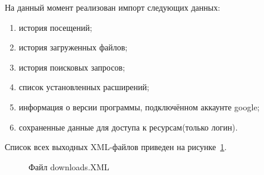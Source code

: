 На данный момент реализован импорт следующих данных:

\begin{enumerate}
  \item история посещений;
  \item история загруженных файлов;
  \item история поисковых запросов;
  \item список установленных расширений;
  \item информация о версии программы, подключённом аккаунте google;
  \item сохраненные данные для доступа к ресурсам(только логин).
\end{enumerate}

Список всех выходных XML-файлов приведен на рисунке~\ref{ship_12:ship_12}.

\begin{figure}[h!]
\caption{Файл downloads.XML}
\label{ship_12:ship_12}
\end{figure}
